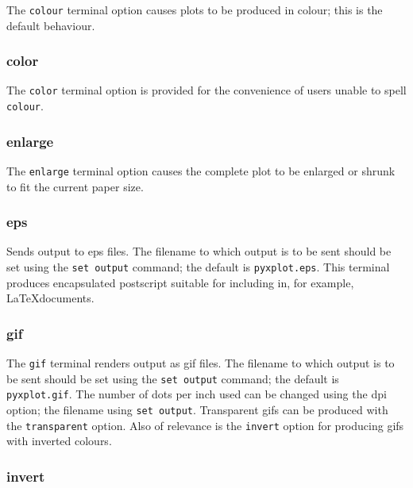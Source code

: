 The {\tt colour} terminal option causes plots to be produced in colour; this is
the default behaviour.

\subsubsection{color}

The {\tt color} terminal option is provided for the convenience of users unable
to spell {\tt colour}.

\subsubsection{enlarge}

The {\tt enlarge} terminal option causes the complete plot to be enlarged or
shrunk to fit the current paper size.

\subsubsection{eps}

Sends output to eps files.  The filename to which output is to be sent should
be set using the {\tt set output} command; the default is
{\tt pyxplot.eps}.  This terminal produces encapsulated postscript
suitable for including in, for example, \LaTeX documents.


\subsubsection{gif}

The {\tt gif} terminal renders output as gif files. The filename to which output
is to be sent should be set using the {\tt set output} command; the default is
{\tt pyxplot.gif}. The number of dots per inch used can be changed using the dpi
option; the filename using {\tt set output}. Transparent gifs can be produced
with the {\tt transparent} option. Also of relevance is the {\tt invert} option
for producing gifs with inverted colours.


\subsubsection{invert}

